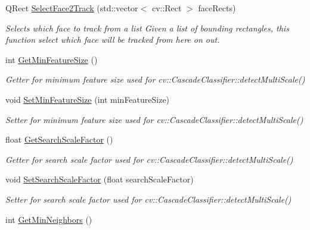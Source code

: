 \begin{DoxyCompactItemize}
Q\-Rect \hyperlink{class_face_tracker_a2e99d33e34874b94f5248950b03ed39f}{Select\-Face2\-Track} (std\-::vector$<$ cv\-::\-Rect $>$ face\-Rects)
\begin{DoxyCompactList}\small\item\em Selects which face to track from a list Given a list of bounding rectangles, this function select which face will be tracked from here on out. \end{DoxyCompactList}\item 
\hypertarget{class_face_tracker_a5a04d2a24e2607a04f187b81b5335391}{int \hyperlink{class_face_tracker_a5a04d2a24e2607a04f187b81b5335391}{Get\-Min\-Feature\-Size} ()}\label{class_face_tracker_a5a04d2a24e2607a04f187b81b5335391}

\begin{DoxyCompactList}\small\item\em Getter for minimum feature size used for cv\-::\-Cascade\-Classifier\-::detect\-Multi\-Scale() \end{DoxyCompactList}\item 
\hypertarget{class_face_tracker_a805d87f3aacd819a3e0fa9a8088b4ec5}{void \hyperlink{class_face_tracker_a805d87f3aacd819a3e0fa9a8088b4ec5}{Set\-Min\-Feature\-Size} (int min\-Feature\-Size)}\label{class_face_tracker_a805d87f3aacd819a3e0fa9a8088b4ec5}

\begin{DoxyCompactList}\small\item\em Setter for minimum feature size used for cv\-::\-Cascade\-Classifier\-::detect\-Multi\-Scale() \end{DoxyCompactList}\item 
\hypertarget{class_face_tracker_a6ca25e531d35ecb61eab4fe8b5ece90b}{float \hyperlink{class_face_tracker_a6ca25e531d35ecb61eab4fe8b5ece90b}{Get\-Search\-Scale\-Factor} ()}\label{class_face_tracker_a6ca25e531d35ecb61eab4fe8b5ece90b}

\begin{DoxyCompactList}\small\item\em Getter for search scale factor used for cv\-::\-Cascade\-Classifier\-::detect\-Multi\-Scale() \end{DoxyCompactList}\item 
\hypertarget{class_face_tracker_acecb45f197f71fb5c8047dee61f1d749}{void \hyperlink{class_face_tracker_acecb45f197f71fb5c8047dee61f1d749}{Set\-Search\-Scale\-Factor} (float search\-Scale\-Factor)}\label{class_face_tracker_acecb45f197f71fb5c8047dee61f1d749}

\begin{DoxyCompactList}\small\item\em Setter for search scale factor used for cv\-::\-Cascade\-Classifier\-::detect\-Multi\-Scale() \end{DoxyCompactList}\item 
\hypertarget{class_face_tracker_a531a750753b8c6f3e000ae0ad1460ef7}{int \hyperlink{class_face_tracker_a531a750753b8c6f3e000ae0ad1460ef7}{Get\-Min\-Neighbors} ()}\label{class_face_tracker_a531a750753b8c6f3e000ae0ad1460ef7}


\end{DoxyCompactItemize}
